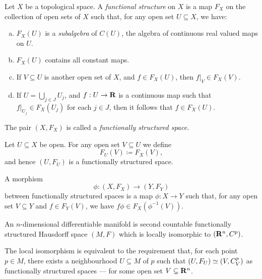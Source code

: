 \begin{definition}
\label{def:functionally-structured-space}
Let \(X\) be a topological space. A \emph{functional structure} on \(X\) is a
map \(F_X\) on the collection of open sets of \(X\) such that, for any open set
\(U \subseteq X\), we have:
\begin{enumerate}[(a)]\setlength\itemsep{0em}
\item \(F_X(U)\) is a
  \emph{subalgebra} of \(C(U)\), the algebra of continuous real valued maps
  on \(U\).

\item \(F_X(U)\) contains all constant maps.

\item If \(V \subseteq U\) is another open set of \(X\), and \(f \in F_X(U)\),
  then \(f|_V \in F_X(V)\).

\item If \(U = \bigcup_{j \in J} U_j\), and \(f: U \to \mathbf{R}\) is a continuous map
  such that \(f|_{U_j} \in F_X(U_j)\) for each \(j \in J\), then it follows that
  \(f \in F_X(U)\).
\end{enumerate}
The pair \((X, F_X)\) is called a \emph{functionally structured space}.

Let \(U \subseteq X\) be open. For any open set \(V \subseteq U\) we define
\[
F_U(V) \coloneq F_X(V),
\]
and hence \((U, F_U)\) is a functionally structured space.
\end{definition}

\begin{definition}
\label{def:morphism-functionally-structured-spaces}
A morphism
\[
\phi: (X, F_X) \to (Y, F_Y)
\]
between functionally structured spaces is a map \(\phi: X \to Y\) such that, for
any open set \(V \subseteq Y\) and \(f \in F_Y(V)\), we have
\(f \phi \in F_X(\phi^{-1}(V))\).
\end{definition}

\begin{definition}
\label{def:second-def-Cp-manifold}
An \(n\)-dimensional differentiable manifold is second countable functionally
structured Hausdorff space \((M, F)\) which is locally isomorphic to
\((\mathbf{R}^n, C^p)\).

The local isomorphism is equivalent to the requirement that, for each
point \(p \in M\), there exists a neighbourhood \(U \subseteq M\) of \(p\) such
that \((U, F_U) \simeq (V, C_V^p)\) as functionally structured spaces --- for
some open set \(V \subseteq \mathbf{R}^n\).
\end{definition}

